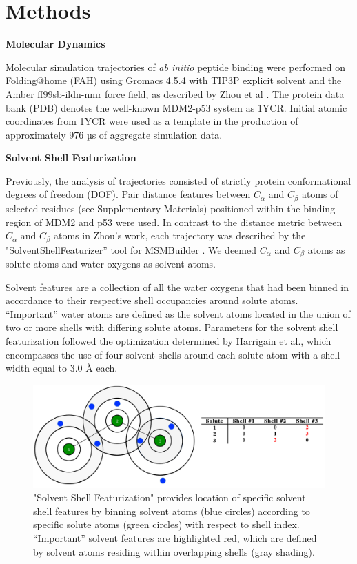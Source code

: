 
\section{Methods}

\textbf{Molecular Dynamics}

Molecular simulation trajectories of \emph{ab initio} peptide binding
were performed on Folding@home (FAH) \cite{larson2009folding} using Gromacs 4.5.4 \cite{hess2008gromacs} with
TIP3P explicit solvent and the Amber ff99sb-ildn-nmr force field, as
described by Zhou et al \cite{zhou2017bridging}. The protein data bank (PDB) denotes the
well-known MDM2-p53 system as 1YCR. Initial atomic coordinates from 1YCR
were used as a template in the production of approximately 976 µs of
aggregate simulation data.

\textbf{Solvent Shell Featurization}

Previously, the analysis of trajectories consisted of strictly protein
conformational degrees of freedom (DOF). Pair distance features between
$C_{\alpha}$ and $C_{\beta}$ atoms of selected residues
(see Supplementary Materials) positioned within the binding region of
MDM2 and p53 were used. In contrast to the distance metric between
$C_{\alpha}$ and $C_{\beta}$ atoms in Zhou's work, each
trajectory was described by the "SolventShellFeaturizer'' tool for
MSMBuilder \cite{harrigan2015conserve}. We deemed $C_{\alpha}$ and $C_{\beta}$ atoms as solute atoms and water oxygens as solvent atoms.

Solvent features are a collection of all the water oxygens that had been
binned in accordance to their respective shell occupancies around solute atoms.
``Important'' water atoms are defined as the solvent atoms located in
the union of two or more shells with differing solute atoms. Parameters
for the solvent shell featurization followed the optimization determined
by Harrigain et al., \cite{harrigan2015conserve} which encompasses the use of four solvent
shells around each solute atom with a shell width equal to 3.0 Å each.


\begin{figure}[h!]
\centering
\includegraphics[scale=0.45]{Figures/SolvShells/IntroSolventShells_.pdf}
\caption{"Solvent Shell Featurization" provides location of
specific solvent shell features by binning solvent atoms (blue circles)
according to specific solute atoms (green circles) with respect to shell
index. ``Important'' solvent features are highlighted red, which are
defined by solvent atoms residing within overlapping shells (gray
shading).}
\label{fig:solvshells}
\end{figure}



